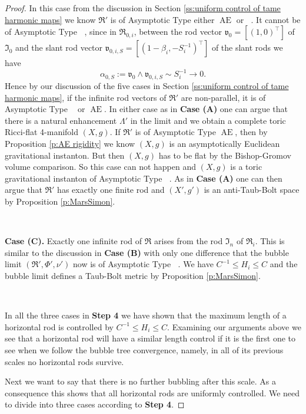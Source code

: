 \documentclass[a4paper,11pt]{amsart}
\theoremstyle{definition}
\numberwithin{equation}{section}
\newcommand{\mv} {\mathfrak v}
\newcommand{\mI} {\mathfrak I}
\newcommand{\mR} {\mathfrak R}
\DeclareMathOperator{\Ae}{AE}
\DeclareMathOperator{\ALFp}{ALF^+}
\DeclareMathOperator{\ALFm}{ALF^{--}}
\begin{document}
\begin{proof}
In this case from the discussion in Section \ref{ss:uniform control of tame harmonic maps} we know $\mR'$ is of Asymptotic Type either $\Ae$ or $\ALFm$. It cannot be of Asymptotic Type $\ALFp$, since in $\mR_{0,i}$, between the rod vector $\mv_0=[(1,0)^\top]$ of $\mI_0$ and the slant rod vector $\mv_{0,i,S}=[(1-\beta_i,-S_i^{-1})^\top]$ of the slant rods we have
\begin{equation}\label{eq:alpha between I0 and slant}
    \alpha_{0,S}:=\mv_0\wedge\mv_{0,i,S}\sim S_{i}^{-1}\to0.
\end{equation}
Hence by our discussion of the five cases in Section \ref{ss:uniform control of tame harmonic maps}, if the infinite rod vectors of $\mR'$ are non-parallel, it is of Asymptotic Type $\ALFm$ or $\Ae$.
In either case as in {\bf Case (A)} one can argue that there is a natural enhancement $\Lambda'$ in the limit and we obtain a complete toric Ricci-flat 4-manifold $(X, g)$. If $\mR'$ is of Asymptotic Type $\Ae$, then by Proposition \ref{p:AE rigidity} we know $(X, g)$ is an asymptotically Euclidean gravitational instanton. But then $(X, g)$ has to be flat by the Bishop-Gromov volume comparison. So this case can not happen and $(X, g)$ is a toric gravitational instanton of Asymptotic Type $\ALFm$. As in {\bf Case (A)} one can then argue that $\mR'$ has exactly one finite rod and $(X', g')$ is an anti-Taub-Bolt space by Proposition \ref{p:MarsSimon}.

\




{\bf Case (C).} Exactly one infinite rod of $\mR$ arises from the rod $\mI_n$ of $\mR_i$. This is similar to the discussion in {\bf Case (B)} with only one difference that the bubble limit $(\mR',\Phi',\nu')$ now is of Asymptotic Type $\ALFp$. We have $C^{-1}\leq H_i\leq C$ and the bubble limit defines a Taub-Bolt metric by Proposition \ref{p:MarsSimon}. 

\

In all the three cases in {\bf Step 4} we have shown that the maximum length of a horizontal rod is controlled by $C^{-1}\leq H_i\leq C$. Examining our arguments above we see that a horizontal rod will have a similar length control if it is the first one to see when we follow the bubble tree convergence, namely, in all of its previous scales no horizontal rods survive. 

Next we want to say that there is no further bubbling after this scale. As a consequence this shows that all horizontal rods are uniformly controlled. We need to divide into three cases according to {\bf Step 4}. 


\end{proof}
\end{document}
